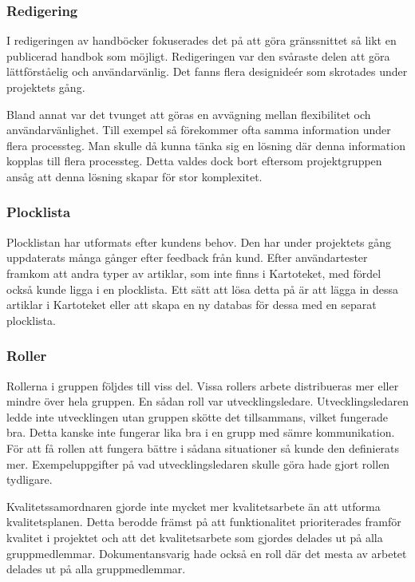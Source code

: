 \documentclass{article}
\begin{document}
\subsubsection{Redigering}
I redigeringen av handböcker fokuserades det på att göra gränssnittet så likt en publicerad handbok som möjligt. Redigeringen var den svåraste delen att göra lättförståelig och användarvänlig. Det fanns flera designideér som skrotades under projektets gång.

Bland annat var det tvunget att göras en avvägning mellan flexibilitet och användar\-vänlighet.
Till exempel så förekommer ofta samma information under flera processteg. Man skulle då kunna tänka sig en lösning där denna information kopplas till flera processteg. Detta valdes dock bort eftersom projektgruppen ansåg att denna lösning skapar för stor komplexitet.

\subsubsection{Plocklista}
Plocklistan har utformats efter kundens behov. Den har under projektets gång uppdaterats många gånger efter feedback från kund. Efter användartester framkom att andra typer av artiklar, som inte finns i Kartoteket, med fördel också kunde ligga i en plocklista. Ett sätt att lösa detta på är att lägga in dessa artiklar i Kartoteket eller att skapa en ny databas för dessa med en separat plocklista.

\subsubsection{Roller}
Rollerna i gruppen följdes till viss del. Vissa rollers arbete distribueras mer eller mindre över hela gruppen. En sådan roll var utvecklingsledare. Utvecklingsledaren ledde inte utvecklingen utan gruppen skötte det tillsammans, vilket fungerade bra. Detta kanske inte fungerar lika bra i en grupp med sämre kommunikation. För att få rollen att fungera bättre i sådana situationer så kunde den definierats mer. Exempeluppgifter på vad utvecklingsledaren skulle göra hade gjort rollen tydligare. 

Kvalitetssamordnaren gjorde inte mycket mer kvalitetsarbete än att utforma kvalitetsplanen. Detta berodde främst på att funktionalitet prioriterades framför kvalitet i projektet och att det kvalitetsarbete som gjordes delades ut på alla gruppmedlemmar. Dokumentansvarig hade också en roll där det mesta av arbetet delades ut på alla gruppmedlemmar. 
\end{document}
